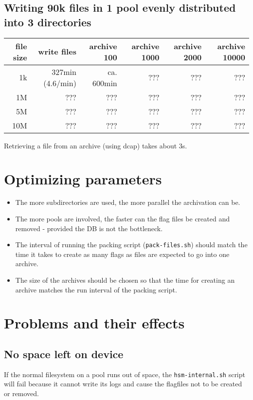 \documentclass[a4paper,8pt]{scrartcl}
\begin{document}
\subsection{Writing 90k files in 1 pool evenly distributed into 3 directories}
\begin{tabular}{|r||r||r|r|r|r|}
  \hline
  file size & write files  & archive 100 & archive 1000 & archive 2000 & archive 10000 \\
  \hline
  1k        & 327min (4.6/min) & ca. 600min & ??? & ??? & ??? \\
  \hline
  1M        & ??? & ??? & ??? & ??? & ??? \\
  \hline
  5M        & ??? & ??? & ??? & ??? & ??? \\
  \hline
  10M       & ??? & ??? & ??? & ??? & ??? \\
  \hline
\end{tabular}


Retrieving a file from an archive (using dcap) takes about 3s.

\section{Optimizing parameters}
\begin{itemize}
  \item The more subdirectories are used, the more parallel the archivation can
    be.
  \item The more pools are involved, the faster can the flag files be created
    and removed - provided the DB is not the bottleneck.
  \item The interval of running the packing script (\texttt{pack-files.sh})
    should match the time it takes to create as many flags as files are
    expected to go into one archive.
  \item The size of the archives should be chosen so that the time for creating
    an archive matches the run interval of the packing script.
\end{itemize}


\section{Problems and their effects}

\subsection{No space left on device}
If the normal filesystem on a pool runs out of space, the
\texttt{hsm-internal.sh} script will fail because it cannot write its logs and
cause the flagfiles not to be created or removed.
\end{document}
